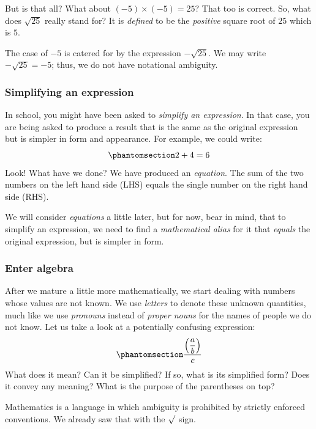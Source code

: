 \documentclass[
  a4paper,
]{article}
\begin{document}
But is that all? What about \((-5) \times (-5) = 25\)? That too is
correct. So, what does \(\sqrt{25}\) really stand for? It is
\emph{defined} to be the \emph{positive} square root of \(25\) which is
\(5\).

The case of \(-5\) is catered for by the expression \(-\sqrt{25}\). We
may write \(-\sqrt{25} = -5\); thus, we do not have notational
ambiguity.

\subsubsection{Simplifying an
expression}\label{simplifying-an-expression}

In school, you might have been asked to \emph{simplify an expression}.
In that case, you are being asked to produce a result that is the same
as the original expression but is simpler in form and appearance. For
example, we could write: \begin{equation}\phantomsection\label{eq:six}{
2 + 4 = 6
}\end{equation} Look! What have we done? We have produced an
\emph{equation}. The sum of the two numbers on the left hand side (LHS)
equals the single number on the right hand side (RHS).

We will consider \emph{equations} a little later, but for now, bear in
mind, that to simplify an expression, we need to find a
\emph{mathematical alias} for it that \emph{equals} the original
expression, but is simpler in form.

\subsubsection{Enter algebra}\label{enter-algebra}

After we mature a little more mathematically, we start dealing with
numbers whose values are not known. We use \emph{letters} to denote
these unknown quantities, much like we use \emph{pronouns} instead of
\emph{proper nouns} for the names of people we do not know. Let us take
a look at a potentially confusing expression:
\begin{equation}\phantomsection\label{eq:abc}{
\dfrac{\left(\dfrac{a}{b}\right)}{c}
}\end{equation} What does it mean? Can it be simplified? If so, what is
its simplified form? Does it convey any meaning? What is the purpose of
the parentheses on top?

Mathematics is a language in which ambiguity is prohibited by strictly
enforced conventions. We already saw that with the \(\surd\) sign.
\end{document}
